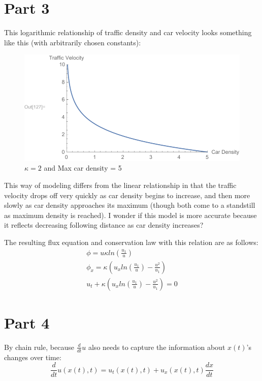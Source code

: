 \documentclass{article}
\begin{document}
\section*{Part 3}
This logarithmic relationship of traffic density and car velocity looks something like this (with arbitrarily chosen constants):
\begin{figure}[H]
  \centering
    \includegraphics[width=\textwidth]{plot1.pdf}
    \caption{$\kappa = 2$ and Max car density = 5}
\end{figure}
This way of modeling differs from the linear relationship in that the traffic velocity drops off very quickly as car density begins to increase, and then more slowly as car density approaches its maximum (though both come to a standstill as maximum density is reached). I wonder if this model is more accurate because it reflects decreasing following distance as car density increases?

The resulting flux equation and conservation law with this relation are as follows:
\begin{equation}
\begin{aligned}
\phi = u \kappa ln(\frac{u_1}{u})\\
\phi_x = \kappa(u_x ln(\frac{u_1}{u}) - \frac{u^2}{u_1})\\
u_t +  \kappa(u_x ln(\frac{u_1}{u}) - \frac{u^2}{u_1}) = 0
\end{aligned}
\end{equation}
\section*{Part 4}
By chain rule, because $\frac{d}{dt}u$ also needs to capture the information about $x(t)$'s changes over time:
\begin{equation}
\frac{d}{dt}u(x(t), t) = u_t(x(t), t) + u_x(x(t), t)\frac{dx}{dt}
\end{equation}
\end{document}
